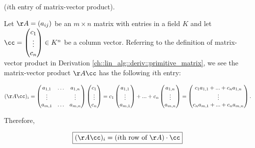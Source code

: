 \begin{theorem}
\label{ch::lin_alg::thm::coordinates_of_matrix_vector_product}
    ($i$th entry of matrix-vector product).
    
    Let $\AA = (a_{ij})$ be an $m \times n$ matrix with entries in a field $K$ and let $\cc = \begin{pmatrix} c_1 \\ \vdots \\ c_n \end{pmatrix} \in K^n$ be a column vector. Referring to the definition of matrix-vector product in Derivation \ref{ch::lin_alg::deriv::primitive_matrix}, we see the matrix-vector product $\AA \cc$ has the following $i$th entry:
    
    \begin{align*}
            (\AA \cc)_i = 
            \begin{pmatrix}
                a_{1,1} & \hdots & a_{1,n} \\
                \vdots & & \vdots \\
                a_{m, 1} & \hdots & a_{m, n}
            \end{pmatrix}
            \begin{pmatrix} c_1 \\ \vdots \\ c_n \end{pmatrix}
            =
            c_1
            \begin{pmatrix} a_{1,1} \\ \vdots \\ a_{m,1} \end{pmatrix}
            +
            ...
            +
            c_n
            \begin{pmatrix} a_{1,n} \\ \vdots \\ a_{m,n} \end{pmatrix}
            =
            \begin{pmatrix} c_1 a_{1, 1} + ... + c_n a_{1, n} \\ \vdots \\ c_n a_{m, 1} + ... + c_n a_{m, n} \end{pmatrix}.
    \end{align*}


    Therefore,
    
    \begin{align*}
        \boxed
        {
            (\AA \cc)_i = (\text{$i$th row of $\AA$}) \cdot \cc
        }
    \end{align*}
    

\end{theorem}
